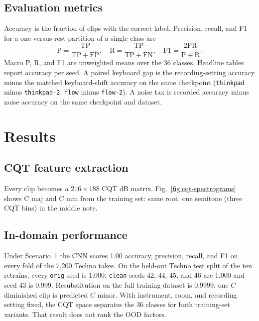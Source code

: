 \documentclass[pdflatex,sn-mathphys-num,iicol]{sn-jnl}
\theoremstyle{thmstyleone}
\theoremstyle{thmstyletwo}
\theoremstyle{thmstylethree}
\begin{document}
\subsection{Evaluation metrics}\label{subsec3_6}

Accuracy is the fraction of clips with the correct label. Precision, recall, and F1 for a one-versus-rest partition of a single class are
\begin{equation}
\mathrm{P}=\frac{\mathrm{TP}}{\mathrm{TP}+\mathrm{FP}},\quad
\mathrm{R}=\frac{\mathrm{TP}}{\mathrm{TP}+\mathrm{FN}},\quad
\mathrm{F1}=\frac{2\mathrm{PR}}{\mathrm{P}+\mathrm{R}}.
\label{eq:prf}
\end{equation}
Macro P, R, and F1 are unweighted means over the 36 classes. Headline tables report accuracy per seed. A paired keyboard gap is the recording-setting accuracy minus the matched keyboard-shift accuracy on the same checkpoint (\texttt{thinkpad} minus \texttt{thinkpad-2}; \texttt{flow} minus \texttt{flow-2}). A noise tax is recorded accuracy minus noise accuracy on the same checkpoint and dataset.

\section{Results}\label{sec4}

\subsection{CQT feature extraction}\label{subsec4_1}

Every clip becomes a $216 \times 188$ CQT dB matrix. Fig.~\ref{fig:cqt-spectrograms} shows C maj and C min from the training set: same root, one semitone (three CQT bins) in the middle note.

\subsection{In-domain performance}\label{subsec4_2}

Under Scenario~1 the CNN scores 1.00 accuracy, precision, recall, and F1 on every fold of the 7{,}200 Techno takes. On the held-out Techno test split of the ten retrains, every \texttt{orig} seed is 1.000; \texttt{clean} seeds 42, 44, 45, and 46 are 1.000 and seed 43 is 0.999. Resubstitution on the full training dataset is 0.9999: one $C$ diminished clip is predicted $C$ minor. With instrument, room, and recording setting fixed, the CQT space separates the 36 classes for both training-set variants. That result does not rank the OOD factors.
\end{document}
